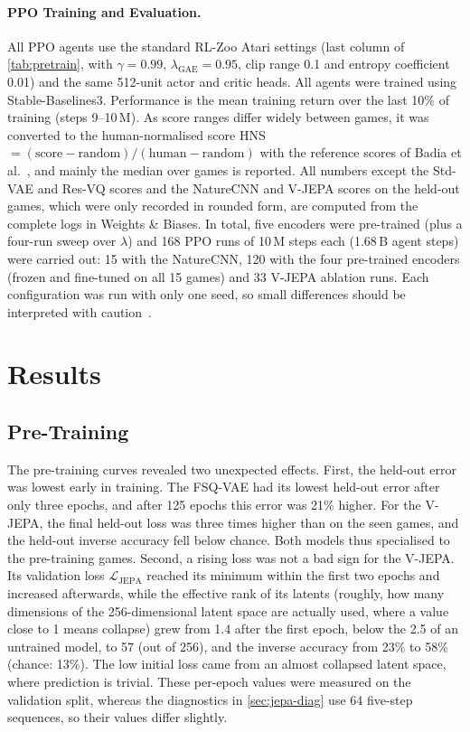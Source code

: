 \documentclass[runningheads,a4paper]{llncs}
\begin{document}
\paragraph{PPO Training and Evaluation.} All PPO agents use the standard RL-Zoo Atari settings (last column of \cref{tab:pretrain},
with $\gamma=0.99$, $\lambda_{\text{GAE}}=0.95$, clip range 0.1 and entropy coefficient 0.01)
and the same 512-unit actor and critic heads. All agents were trained using
Stable-Baselines3. Performance is the mean training return over the last 10\% of training (steps 9--10\,M). As
score ranges differ widely between games, it was converted to the human-normalised score
HNS$=(\text{score}-\text{random})/(\text{human}-\text{random})$ with the reference scores of
Badia et al.~\cite{badia2020agent57}, and mainly the median over games is reported. All numbers
except the Std-VAE and Res-VQ scores and the NatureCNN and V-JEPA scores on the held-out games,
which were only recorded in rounded form, are computed from the complete logs in Weights \& Biases. In total, five encoders were pre-trained (plus a four-run sweep over $\lambda$) and 168 PPO runs of 10\,M steps each
(1.68\,B agent steps) were carried out: 15 with the NatureCNN, 120 with the four pre-trained
encoders (frozen and fine-tuned on all 15 games) and 33 V-JEPA ablation runs. Each configuration was run with only one
seed, so small differences should be interpreted with caution~\cite{agarwal2021precipice}.


\section{Results}
\label{sec:results}

\subsection{Pre-Training}
\label{sec:pretrain-res}

The pre-training curves revealed two unexpected effects. First, the
held-out error was lowest early in training. The FSQ-VAE had its lowest
held-out error after only three epochs, and after 125 epochs this error was 21\% higher. For the
V-JEPA, the final held-out loss was three times higher than on the seen games, and the held-out
inverse accuracy fell below chance. Both models thus specialised to the pre-training games. Second, a rising loss was not a bad sign for the V-JEPA. Its validation
loss $\mathcal{L}_{\text{JEPA}}$ reached its minimum within the first two epochs and increased
afterwards, while the effective rank of its
latents (roughly, how many dimensions of the 256-dimensional latent space are actually used,
where a value close to 1 means collapse) grew from 1.4 after the first epoch, below the 2.5 of an untrained model, to 57 (out of
256), and the inverse accuracy from 23\% to 58\% (chance: 13\%). The low initial loss came from
an almost collapsed latent space, where prediction is trivial. These per-epoch values were
measured on the validation split, whereas the diagnostics in \cref{sec:jepa-diag} use 64 five-step
sequences, so their values differ slightly.
\end{document}
